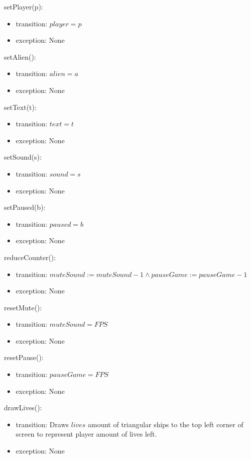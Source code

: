\documentclass[12pt]{article}
\begin{document}
\noindent setPlayer(p):
\begin{itemize}
    \item transition: $player = p$
    \item exception: None
\end{itemize}

\noindent setAlien():
\begin{itemize}
    \item transition: $alien = a$
    \item exception: None
\end{itemize}

\noindent setText(t):
\begin{itemize}
    \item transition: $text = t$
    \item exception: None
\end{itemize}

\noindent setSound(s):
\begin{itemize}
    \item transition: $sound = s$
    \item exception: None
\end{itemize}

\noindent setPaused(b):
\begin{itemize}
    \item transition: $paused = b$
    \item exception: None
\end{itemize}

\noindent reduceCounter():
\begin{itemize}
    \item transition: $ muteSound := muteSound - 1 \land pauseGame := pauseGame - 1 $
    \item exception: None
\end{itemize}

\noindent resetMute():
\begin{itemize}
    \item transition: $ muteSound = FPS $
    \item exception: None
\end{itemize}

\noindent resetPause():
\begin{itemize}
    \item transition: $ pauseGame = FPS $
    \item exception: None
\end{itemize}

\noindent drawLives():
\begin{itemize}
    \item transition: Draws $lives$ amount of triangular ships to the top left corner of screen to represent player amount of lives left.
    \item exception: None
\end{itemize}
\end{document}
